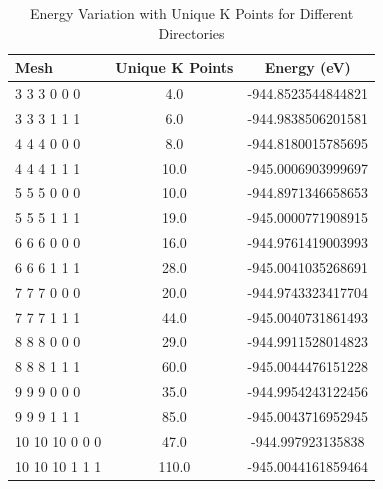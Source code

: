 \documentclass[11pt]{article}
\begin{document}
\begin{table}[h!]
    \centering
    \begin{tabular}{l c c}
        \toprule
        \textbf{Mesh} & \textbf{Unique K Points} & \textbf{Energy (eV)} \\
        \midrule
        3 3 3 0 0 0  & 4.0   & -944.8523544844821 \\
        3 3 3 1 1 1  & 6.0   & -944.9838506201581 \\
        4 4 4 0 0 0  & 8.0   & -944.8180015785695 \\
        4 4 4 1 1 1  & 10.0  & -945.0006903999697 \\
        5 5 5 0 0 0  & 10.0  & -944.8971346658653 \\
        5 5 5 1 1 1  & 19.0  & -945.0000771908915 \\
        6 6 6 0 0 0  & 16.0  & -944.9761419003993 \\
        6 6 6 1 1 1  & 28.0  & -945.0041035268691 \\
        7 7 7 0 0 0  & 20.0  & -944.9743323417704 \\
        7 7 7 1 1 1  & 44.0  & -945.0040731861493 \\
        8 8 8 0 0 0  & 29.0  & -944.9911528014823 \\
        8 8 8 1 1 1  & 60.0  & -945.0044476151228 \\
        9 9 9 0 0 0  & 35.0  & -944.9954243122456 \\
        9 9 9 1 1 1  & 85.0  & -945.0043716952945 \\
        10 10 10 0 0 0 & 47.0 & -944.997923135838  \\
        10 10 10 1 1 1 & 110.0 & -945.0044161859464 \\
        \bottomrule
    \end{tabular}
    \caption{Energy Variation with Unique K Points for Different Directories}
    \label{table:energy_kpoints}
\end{table}
\end{document}
